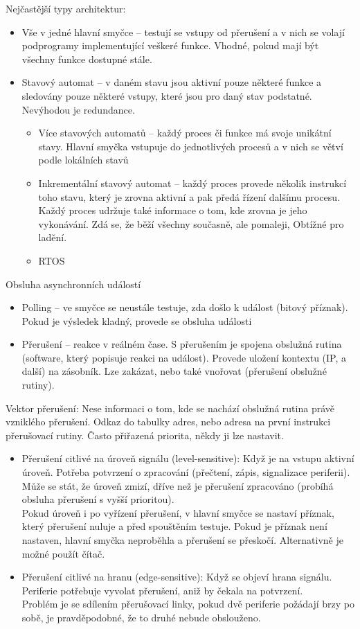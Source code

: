 \documentclass[a4paper, 11pt]{report}
\begin{document}
Nejčastější typy architektur:
\begin{itemize}
	\item Vše v jedné hlavní smyčce -- testují se vstupy od přerušení a v nich se volají podprogramy implementující veškeré funkce. Vhodné, pokud mají být všechny funkce dostupné stále.
	\item Stavový automat -- v daném stavu jsou aktivní pouze některé funkce a sledovány pouze některé vstupy, které jsou pro daný stav podstatné. Nevýhodou je redundance.
	\begin{itemize}
		\item Více stavových automatů -- každý proces či funkce má svoje unikátní stavy. Hlavní smyčka vstupuje do jednotlivých procesů a v nich se větví podle lokálních stavů
		\item Inkrementální stavový automat -- každý proces provede několik instrukcí toho stavu, který je zrovna aktivní a pak předá řízení dalšímu procesu. Každý proces udržuje také informace o tom, kde zrovna je jeho vykonávání. Zdá se, že běží všechny současně, ale pomaleji, Obtížné pro ladění.
		\item RTOS
	\end{itemize}
\end{itemize}

Obsluha asynchronních událostí
\begin{itemize}
	\item Polling -- ve smyčce se neustále testuje, zda došlo k událost (bitový příznak). Pokud je výsledek kladný, provede se obsluha události
	\item Přerušení -- reakce v reálném čase. S přerušením je spojena obslužná rutina (software, který popisuje reakci na událost). Provede uložení kontextu (IP, a další) na zásobník. Lze zakázat, nebo také vnořovat (přerušení obslužné rutiny).
\end{itemize}

Vektor přerušení: Nese informaci o tom, kde se nachází obslužná rutina právě vzniklého přerušení. Odkaz do tabulky adres, nebo adresa na první instrukci přerušovací rutiny. Často přiřazená priorita, někdy ji lze nastavit.

\begin{itemize}
	\item Přerušení citlivé na úroveň signálu (level-sensitive): Když je na vstupu aktivní úroveň. Potřeba potvrzení o zpracování (přečtení, zápis, signalizace periferii). Může se stát, že úroveň zmizí, dříve než je přerušení zpracováno (probíhá obsluha přerušení s vyšší prioritou).\\
	Pokud úroveň  i po vyřízení přerušení, v hlavní smyčce se nastaví příznak, který přerušení nuluje a před spouštěním testuje. Pokud je příznak není nastaven, hlavní smyčka neproběhla a přerušení se přeskočí. Alternativně je možné použít čítač.
	\item Přerušení citlivé na hranu (edge-sensitive): Když se objeví hrana signálu. Periferie potřebuje vyvolat přerušení, aniž by čekala na potvrzení.\\
	Problém je se sdílením přerušovací linky, pokud dvě periferie požádají brzy po sobě, je pravděpodobné, že to druhé nebude obslouženo.
\end{itemize}
\end{document}
